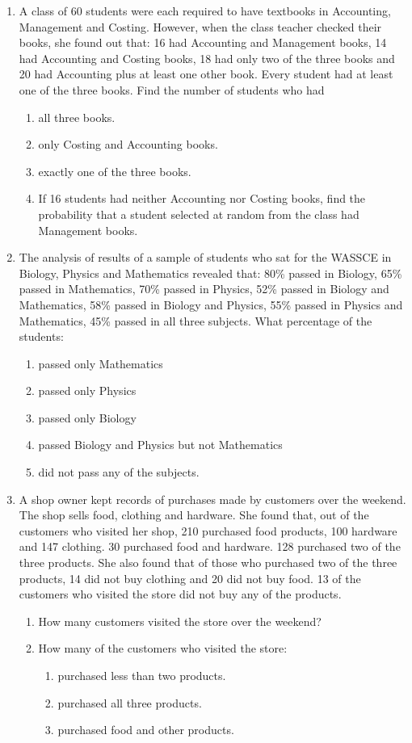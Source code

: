 \begin{enumerate}[resume]
\item A class of 60 students were each required to have textbooks in Accounting,
Management and Costing. However, when the class teacher checked their
books, she found out that: 16 had Accounting and Management books, 14
had Accounting and Costing books, 18 had only two of the three books and
20 had Accounting plus at least one other book. Every student had at
least one of the three books. Find the number of students who had
\begin{enumerate}
  \item[a.] all three books.
  \item[b.] only Costing and Accounting books.
  \item[c.] exactly one of the three books.
  \item[d.] If 16 students had neither Accounting nor Costing books, find the
  probability that a student selected at random from the class had Management books.
\end{enumerate}

\item The analysis of results of a sample of students who sat for the WASSCE
in Biology, Physics and Mathematics revealed that: 80\% passed in Biology,
65\% passed in Mathematics, 70\% passed in Physics, 52\% passed in Biology
and Mathematics, 58\% passed in Biology and Physics, 55\% passed in
Physics and Mathematics, 45\% passed in all three subjects. What
percentage of the students:
\begin{enumerate}
  \item[a.] passed only Mathematics
  \item[b.] passed only Physics
  \item[c.] passed only Biology
  \item[d.] passed Biology and Physics but not Mathematics
  \item[e.] did not pass any of the subjects.
\end{enumerate}

\item A shop owner kept records of purchases made by customers over the
weekend. The shop sells food, clothing and hardware. She found that, out
of the customers who visited her shop, 210 purchased food products, 100
hardware and 147 clothing. 30 purchased food and hardware. 128 purchased
two of the three products. She also found that of those who purchased two
of the three products, 14 did not buy clothing and 20 did not buy food. 13
of the customers who visited the store did not buy any of the products.
\begin{enumerate}
  \item[a.] How many customers visited the store over the weekend?
  \item[b.] How many of the customers who visited the store:
  \begin{enumerate}
    \item[i.] purchased less than two products.
    \item[ii.] purchased all three products.
    \item[iii.] purchased food and other products.
  \end{enumerate}
\end{enumerate}


\end{enumerate}
